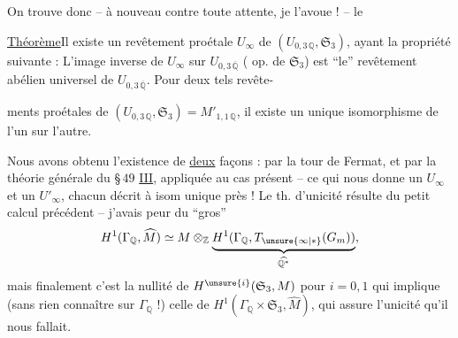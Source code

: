 On trouve donc -- à nouveau contre toute attente, je l'avoue ! -- le

\uline{Théorème}\quad Il existe un revêtement
proétale  $U_\infty$ de $(U_{0,3\,\mathbb Q},\mathfrak S_3)$, ayant la propriété suivante : L'image inverse  de $U_\infty$ sur $U_{0,3\,\overline{\mathbb Q}}$ ( op. de $\mathfrak S_3$) est ``le'' revêtement abélien universel de $U_{0,3\,\overline{\mathbb Q}}$. Pour deux tels revête-



ments proétales de $(U_{0,3\,\mathbb Q},\mathfrak S_3)=M'_{1,1\,\mathbb Q}$, il existe un unique isomorphisme de l'un sur l'autre.

Nous avons obtenu l'existence de \uline{deux} façons : par la tour de Fermat, et par la théorie générale du \S\,$49$ \uline{III}, appliquée au cas présent -- ce qui nous donne un $U_\infty$ et un $U'_\infty$, chacun décrit à isom unique près ! Le th. d'unicité résulte du petit calcul précédent -- j'avais peur du ``gros'' 
\[
H^1(\Gamma_{\mathbb Q},\widehat M)\simeq
M\otimes_{\mathbb Z}\underbrace{H^1(\Gamma_{\mathbb Q},T_{\unsure{\infty|*}}(G_m))}_{\widehat{\mathbb Q^{*}}},
\]
mais finalement c'est la nullité de $H^{\unsure{i}}(\mathfrak S_3,M)$ pour $i=0,1$ qui implique (sans rien connaître sur $\Gamma_{\mathbb Q}$ !) celle de $H^1(\Gamma_{\mathbb Q}\times\mathfrak S_3,\widehat M)$, qui assure l'unicité qu'il nous fallait.



